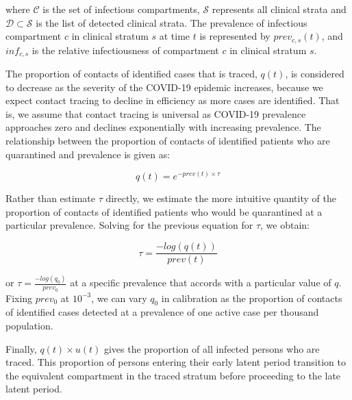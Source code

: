 where $\mathcal{C}$ is the set of infectious compartments, $\mathcal{S}$ represents all clinical strata and $\mathcal{D} \subset \mathcal{S}$ is the list of detected clinical strata.
The prevalence of infectious compartment $c$ in clinical stratum $s$ at time $t$ is represented by $prev_{c, s}(t)$, and $inf_{c, s}$ is the relative infectiousness of compartment $c$ in clinical stratum $s$.

The proportion of contacts of identified cases that is traced, \(q(t)\), is considered to decrease as the severity of the COVID-19 epidemic increases, because we expect contact tracing to decline in efficiency as more cases are identified.
That is, we assume that contact tracing is universal as COVID-19 prevalence approaches zero and declines exponentially with increasing prevalence.
The relationship between the proportion of contacts of identified patients who are quarantined and prevalence is given as:

\[q(t) = e^{-prev(t) \times \tau }\]

Rather than estimate \(\tau\) directly, we estimate the more intuitive quantity of the proportion of contacts of identified patients who would be quarantined at a particular prevalence.
Solving for the previous equation for \(\tau\), we obtain:

\[\tau = \frac{-log(q(t))}{prev(t)} \]

or \(\tau = \frac{-log(q_{0})}{prev_{0}} \) at a specific prevalence that accords with a particular value of \(q\). Fixing \(prev_{0}\) at \(10^{-3}\), we can vary \(q_{0}\) in calibration as the proportion of contacts of identified cases detected at a prevalence of one active case per thousand population.

Finally, \(q(t) \times u(t) \) gives the proportion of all infected persons who are traced. This proportion of persons entering their early latent period transition to the equivalent compartment in the traced stratum before proceeding to the late latent period.